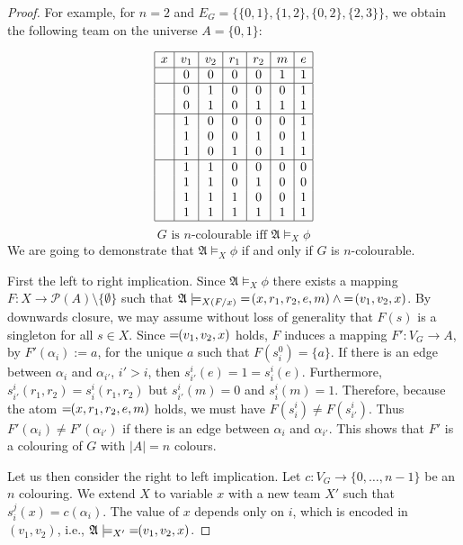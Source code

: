 \documentclass{article}
\theoremstyle{plain}
\theoremstyle{definition}
\newcommand{\mA}{{\mathfrak A}}
\newcommand*\dep{{=\mkern-1.2mu}}
\begin{document}
\begin{proof}
	For example, for $n= 2$ and $E_G = \{\{0,1\},\{1,2\},\{0,2\},\{2,3\}\}$, we  obtain the following team on the universe $A= \{0,1\}$:
	
	$$\begin{array}{|c|c|c|c|c|c|c|}
	\hline
	x & v_1 & v_2 & r_1 & r_2 & m & e \\
	\hline
	& 0 & 0 & 0 & 0 & 1 & 1 \\
	\hline
	& 0 & 1 & 0 & 0 & 0 & 1 \\
	& 0 & 1 & 0 & 1 & 1 & 1 \\
	\hline
	& 1 & 0 & 0 & 0 & 0 & 1 \\
	& 1 & 0 & 0 & 1 & 0 & 1 \\
	& 1 & 0 & 1 & 0 & 1 & 1 \\
	\hline
	& 1 & 1 & 0 & 0 & 0 & 0 \\
	& 1 & 1 & 0 & 1 & 0 & 0 \\
	& 1 & 1 & 1 & 0 & 0 & 1 \\
	& 1 & 1 & 1 & 1 & 1 & 1 \\
	\hline
	\end{array}$$
	$$G \text{ is } n\text{-colourable iff } \mA\models_X \phi$$
	We are going to demonstrate that $\mA \models_X \phi$ if and only if $G$ is $n$-colourable.
	
	First the left to right implication. Since $\mA\models_X \phi$ there exists  a mapping  $F\colon X\rightarrow \mathcal{P}(A)\setminus \{\emptyset\}$ such that $\mA\models_{X(F/x)} \dep\left(x,r_1,r_2,e,m\right)\wedge \dep \left(v_1,v_2,x\right)$.  By downwards closure, we may assume without loss of generality that $F(s)$ is a singleton for all $s\in X$.
Since  $\dep(v_1,v_2,x)$ holds,  $F$ induces a mapping  $F'\colon V_G \rightarrow A$, by 
$F'(\alpha_i) := a $, for the unique $a$ such that $F(s_i^0)=\{a\}$. If there is an edge between $\alpha_i$ and $\alpha_{i'}$, $i' > i$, then $s_{i'}^{i}(e) = 1 = s_i^{i}(e)$. Furthermore, $s_{i'}^{i}(r_1,r_2) = s_{i}^{i}(r_1,r_2)$ but $ s_{i'}^{i}(m) = 0$ and $s_{i}^{i}(m) = 1$. Therefore, because the atom  $\dep (x,r_1,r_2,e,m)$ holds,  we must have $F(s_{i}^{i}) \neq  F(s_{i'}^{i})$. Thus  $F'(\alpha_i) \neq F'(\alpha_{i'})$ if there is an edge between $\alpha_i$ and $\alpha_{i'}$.  This shows that $F'$ is a colouring of $G$ with $|A| =  n$ colours.
	
	Let us then consider the right to left implication. Let $c: V_G \rightarrow \{0,\ldots ,n-1\}$ be an $n$ colouring. We extend $X$ to variable $x$ with a new team $X'$ such that $s^j_i(x) = c(\alpha_i)$. The value of $x$ depends only on $i$, which is encoded in $(v_1,v_2)$, i.e., $\mA \models_{X'} \dep(v_1,v_2,x)$.
	

\end{proof}
\end{document}
